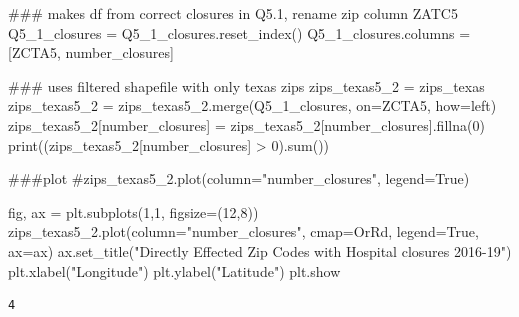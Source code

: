 \documentclass[
  letterpaper,
  DIV=11,
  numbers=noendperiod]{scrartcl}
\newenvironment{Shaded}{\begin{snugshade}}{\end{snugshade}}
\newcommand{\BuiltInTok}[1]{\textcolor[rgb]{0.00,0.23,0.31}{#1}}
\newcommand{\CommentTok}[1]{\textcolor[rgb]{0.37,0.37,0.37}{#1}}
\newcommand{\DecValTok}[1]{\textcolor[rgb]{0.68,0.00,0.00}{#1}}
\newcommand{\NormalTok}[1]{\textcolor[rgb]{0.00,0.23,0.31}{#1}}
\newcommand{\OperatorTok}[1]{\textcolor[rgb]{0.37,0.37,0.37}{#1}}
\newcommand{\StringTok}[1]{\textcolor[rgb]{0.13,0.47,0.30}{#1}}
\newcommand{\VariableTok}[1]{\textcolor[rgb]{0.07,0.07,0.07}{#1}}
\begin{document}
\begin{Shaded}
\begin{Highlighting}[]
\CommentTok{\#\#\# makes df from correct closures in Q5.1, rename zip column ZATC5}
\NormalTok{Q5\_1\_closures }\OperatorTok{=}\NormalTok{ Q5\_1\_closures.reset\_index()}
\NormalTok{Q5\_1\_closures.columns }\OperatorTok{=}\NormalTok{ [}\StringTok{\textquotesingle{}ZCTA5\textquotesingle{}}\NormalTok{, }\StringTok{\textquotesingle{}number\_closures\textquotesingle{}}\NormalTok{]}

\CommentTok{\#\#\# uses filtered shapefile with only texas zips}
\NormalTok{zips\_texas5\_2 }\OperatorTok{=}\NormalTok{ zips\_texas}
\NormalTok{zips\_texas5\_2 }\OperatorTok{=}\NormalTok{ zips\_texas5\_2.merge(Q5\_1\_closures, on}\OperatorTok{=}\StringTok{\textquotesingle{}ZCTA5\textquotesingle{}}\NormalTok{, how}\OperatorTok{=}\StringTok{\textquotesingle{}left\textquotesingle{}}\NormalTok{)}
\NormalTok{zips\_texas5\_2[}\StringTok{\textquotesingle{}number\_closures\textquotesingle{}}\NormalTok{] }\OperatorTok{=}\NormalTok{ zips\_texas5\_2[}\StringTok{\textquotesingle{}number\_closures\textquotesingle{}}\NormalTok{].fillna(}\DecValTok{0}\NormalTok{)}
\BuiltInTok{print}\NormalTok{((zips\_texas5\_2[}\StringTok{\textquotesingle{}number\_closures\textquotesingle{}}\NormalTok{] }\OperatorTok{\textgreater{}} \DecValTok{0}\NormalTok{).}\BuiltInTok{sum}\NormalTok{())}

\CommentTok{\#\#\#plot}
\CommentTok{\#zips\_texas5\_2.plot(column="number\_closures", legend=True)}

\NormalTok{fig, ax }\OperatorTok{=}\NormalTok{ plt.subplots(}\DecValTok{1}\NormalTok{,}\DecValTok{1}\NormalTok{, figsize}\OperatorTok{=}\NormalTok{(}\DecValTok{12}\NormalTok{,}\DecValTok{8}\NormalTok{))}
\NormalTok{zips\_texas5\_2.plot(column}\OperatorTok{=}\StringTok{"number\_closures"}\NormalTok{, cmap}\OperatorTok{=}\StringTok{\textquotesingle{}OrRd\textquotesingle{}}\NormalTok{, legend}\OperatorTok{=}\VariableTok{True}\NormalTok{, ax}\OperatorTok{=}\NormalTok{ax)}
\NormalTok{ax.set\_title(}\StringTok{"Directly Effected Zip Codes with Hospital closures 2016{-}19"}\NormalTok{)}
\NormalTok{plt.xlabel(}\StringTok{"Longitude"}\NormalTok{)}
\NormalTok{plt.ylabel(}\StringTok{"Latitude"}\NormalTok{)}
\NormalTok{plt.show}
\end{Highlighting}
\end{Shaded}

\begin{verbatim}
4
\end{verbatim}
\end{document}
